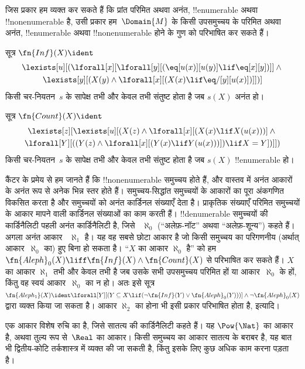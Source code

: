 \documentclass[../../../include/open-logic-section]{subfiles}
\begin{document}


\begin{explain}
जिस प्रकार हम व्यक्त कर सकते हैं कि प्रांत परिमित अथवा अनंत,
!!{enumerable} अथवा !!{nonenumerable} है, उसी प्रकार हम~$\Domain{M}$ के
किसी उपसमुच्चय के परिमित अथवा अनंत, !!{enumerable} अथवा !!{nonenumerable}
होने के गुण को परिभाषित कर सकते हैं।
\end{explain}

\begin{prop}
सूत्र $\fn{Inf}(X) \ident$
\begin{multline*}
\lexists[u][(\lforall[x][\lforall[y][(\eq[u(x)][u(y)] \lif 
      \eq[x][y])]] \land {} \\\lexists[y][(X(y) \land \lforall[x][(X(x)
      \lif \eq/[y][u(x)])]])]
\end{multline*}
किसी चर-नियतन~$s$ के सापेक्ष तभी और केवल तभी संतुष्ट होता है जब $s(X)$
अनंत हो।
\end{prop}

\begin{prop}
सूत्र $\fn{Count}(X) \ident $
\begin{multline*}
\lexists[z][\lexists[u][(X(z) \land 
    \lforall[x][(X(x) \lif X(u(x)))] \land {} \\ \lforall[Y][((Y(z) \land
      \lforall[x][(Y(x) \lif Y(u(x)))]) \lif X = Y])]])
\end{multline*}
किसी चर-नियतन~$s$ के सापेक्ष तभी और केवल तभी संतुष्ट होता है जब $s(X)$
!!{enumerable} हो।
\end{prop}

कैंटर के प्रमेय से हम जानते हैं कि !!{nonenumerable} समुच्चय होते हैं, और
वास्तव में अनंत आकारों के अनंत रूप से अनेक भिन्न स्तर होते हैं।
समुच्चय-सिद्धांत समुच्चयों के आकारों का पूरा अंकगणित विकसित करता है और
समुच्चयों को अनंत कार्डिनल संख्याएँ देता है। प्राकृतिक संख्याएँ परिमित
समुच्चयों के आकार मापने वाली कार्डिनल संख्याओं का काम करती हैं।
!!{denumerable} समुच्चयों की कार्डिनैलिटी पहली अनंत कार्डिनैलिटी है, जिसे
~$\aleph_0$ (``अलेफ़-नॉट'' अथवा ``अलेफ़-शून्य'') कहते हैं। अगला अनंत आकार
~$\aleph_1$ है। यह वह सबसे छोटा आकार है जो किसी समुच्चय का परिगणनीय
(अर्थात् आकार~$\aleph_0$ का) हुए बिना हो सकता है। ``$X$ का आकार
$\aleph_0$ है'' को हम $\fn{Aleph}_0(X) \liff \fn{Inf}(X) \land
\fn{Count}(X)$ से परिभाषित कर सकते हैं। $X$ का आकार $\aleph_1$ तभी और केवल
तभी है जब उसके सभी उपसमुच्चय परिमित हों या आकार~$\aleph_0$ के हों, किंतु
वह स्वयं आकार~$\aleph_0$ का न हो। अतः इसे सूत्र $\fn{Aleph_1}(X) \ident
\lforall[Y][(Y \subseteq X \lif (\lnot\fn{Inf}(Y) \lor
\fn{Aleph}_0(Y)))] \land \lnot \fn{Aleph}_0(X)$ द्वारा व्यक्त किया जा
सकता है। आकार $\aleph_2$ का होना भी इसी प्रकार परिभाषित होता है, इत्यादि।

एक आकार विशेष रुचि का है, जिसे सातत्य की कार्डिनैलिटी कहते हैं। यह
$\Pow{\Nat}$ का आकार है, अथवा तुल्य रूप से~$\Real$ का आकार। किसी समुच्चय का
आकार सातत्य के बराबर है, यह बात भी द्वितीय-कोटि तर्कशास्त्र में व्यक्त की
जा सकती है, किंतु इसके लिए कुछ अधिक काम करना पड़ता है।
\end{document}
